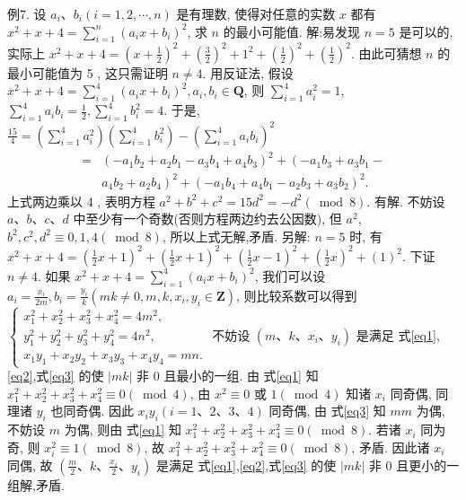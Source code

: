 例7. 设 $a_i 、 b_i(i=1,2, \cdots, n)$ 是有理数, 使得对任意的实数 $x$ 都有 $x^2+x+4=\sum_{i=1}^n\left(a_i x+b_i\right)^2$, 求 $n$ 的最小可能值.
解:易发现 $n=5$ 是可以的, 实际上 $x^2+x+4=\left(x+\frac{1}{2}\right)^2+\left(\frac{3}{2}\right)^2+ 1^2+\left(\frac{1}{2}\right)^2+\left(\frac{1}{2}\right)^2$.
由此可猜想 $n$ 的最小可能值为 5 , 这只需证明 $n \neq 4$.
用反证法, 假设 $x^2+x+4=\sum_{i=1}^4\left(a_i x+b_i\right)^2, a_i, b_i \in \mathbf{Q}$, 则 $\sum_{i=1}^4 a_i^2=1$, $\sum_{i=1}^4 a_i b_i=\frac{1}{2}, \sum_{i=1}^4 b_i^2=4$.
于是, $\frac{15}{4}=\left(\sum_{i=1}^4 a_i^2\right)\left(\sum_{i=1}^4 b_i^2\right)-\left(\sum_{i=1}^4 a_i b_i\right)^2$
$$
\begin{aligned}
= & \left(-a_1 b_2+a_2 b_1-a_3 b_4+a_4 b_3\right)^2+\left(-a_1 b_3+a_3 b_1-\right. \\
& \left.a_4 b_2+a_2 b_4\right)^2+\left(-a_1 b_4+a_4 b_1-a_2 b_3+a_3 b_2\right)^2 .
\end{aligned}
$$
上式两边乘以 4 , 表明方程 $a^2+b^2+c^2=15 d^2=-d^2(\bmod 8)$. 有解.
不妨设 $a 、 b 、 c 、 d$ 中至少有一个奇数(否则方程两边约去公因数), 但 $a^2$, $b^2, c^2, d^2 \equiv 0,1,4(\bmod 8)$, 所以上式无解,矛盾.
另解: $n=5$ 时, 有 $x^2+x+4=\left(\frac{1}{2} x+1\right)^2+\left(\frac{1}{2} x+1\right)^2+\left(\frac{1}{2} x-1\right)^2+ \left(\frac{1}{2} x\right)^2+(1)^2$.
下证 $n \neq 4$.
如果 $x^2+x+4=\sum_{i=1}^4\left(a_i x+b_i\right)^2$, 我们可以设 $a_i=\frac{x_i}{2 m}, b_i=\frac{y_i}{k}\left(m k \neq 0, m, k, x_i, y_i \in \mathbf{Z}\right)$, 
则比较系数可以得到 $\left\{\begin{array}{l}x_1^2+x_2^2+x_3^2+x_4^2=4 m^2, \label{eq1}\\ y_1^2+y_2^2+y_3^2+y_4^2=4 n^2, \label{eq2}\\ x_1 y_1+x_2 y_2+x_3 y_3+x_4 y_4=m n. \label{eq3}\end{array}\right.$
不妨设 $\left(m 、 k 、 x_i 、 y_i\right)$ 是满足 式\ref{eq1},\ref{eq2},式\ref{eq3} 的使 $|m k|$ 非 0 且最小的一组.
由 式\ref{eq1} 知 $x_1^2+x_2^2+x_3^2+x_4^2 \equiv 0(\bmod 4)$, 由 $x^2 \equiv 0$ 或 $1(\bmod 4)$ 知诸 $x_i$ 同奇偶, 同理诸 $y_i$ 也同奇偶.
因此 $x_i y_i(i=1 、 2 、 3 、 4)$ 同奇偶, 由 式\ref{eq3} 知 $m m$ 为偶, 不妨设 $m$ 为偶, 则由 式\ref{eq1} 知 $x_1^2+x_2^2+x_3^2+x_4^2 \equiv 0(\bmod 8)$.
若诸 $x_i$ 同为奇, 则 $x_i^2 \equiv 1(\bmod 8)$, 故 $x_1^2+x_2^2+x_3^2+x_4^2 \equiv 0(\bmod 8)$, 矛盾.
因此诸 $x_i$ 同偶, 故 $\left(\frac{m}{2} 、 k 、 \frac{x_i}{2} 、 y_i\right)$ 是满足 式\ref{eq1},\ref{eq2},式\ref{eq3} 的使 $|m k|$ 非 0 且更小的一组解,矛盾.



